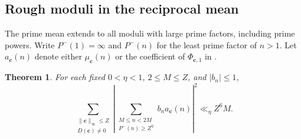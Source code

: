 \documentclass[11pt,letterpaper]{article}
\newtheorem{theorem}{Theorem}[section]
\theoremstyle{definition}
\begin{document}
\subsection{Rough moduli in the reciprocal mean}
The prime mean extends to all moduli with large prime factors,
including prime powers. Write $P^-(1)=\infty$ and $P^-(n)$ for
the least prime factor of $n>1$. Let $a_{\mathbf c}(n)$ denote
either $\mu_{\mathbf c}(n)$ or the coefficient of
$\Phi_{\mathbf c,1}$ in \cite[(1.6)]{c3:wang}.
\begin{theorem}\label{c3:roughmean}
For each fixed $0<\eta<1$, $2\le M\le Z$, and $|b_n|\le1$,
\[
 \sum_{\substack{\|\mathbf c\|_\infty\le Z\\D(\mathbf c)\ne0}}
 \left|\sum_{\substack{M\le n<2M\\ P^-(n)\ge Z^\eta}}
         b_n a_{\mathbf c}(n)\right|^2 \ll_\eta Z^6 M .
\]
\end{theorem}
\end{document}

